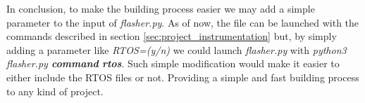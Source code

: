 In conclusion, to make the building process easier we may add a simple parameter
to the input of \textit{flasher.py}. As of now, the file can be launched with
the commands described in section \ref{sec:project_instrumentation} but, by simply
adding a parameter like \textit{RTOS=(y/n)} we could launch \textit{flasher.py} with
\textit{python3 flasher.py \textbf{command} \textbf{rtos}}. Such simple modification
would make it easier to either include the RTOS files or not. Providing a simple
and fast building process to any kind of project.